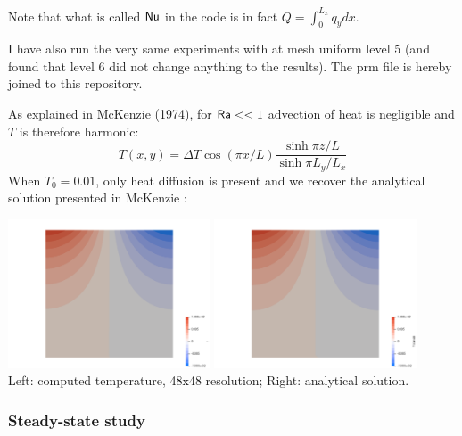 Note that what is called ${\mathsf{Nu}}$ in the code is in fact $Q=\int_0^{L_x} q_y dx$.

I have also run the very same experiments with \aspect{} at mesh uniform level 5 (and found that 
level 6 did not change anything to the results). The prm file is hereby joined to this repository.

As explained in McKenzie \etal (1974), for ${\mathsf{Ra}} <<1$ advection of heat is negligible and $T$ is 
therefore harmonic:
\[
T(x,y) = \Delta T \cos (\pi x/L) \frac{\sinh \pi z/L}{\sinh \pi L_y/L_x}
\]
When $T_0=0.01$, only heat diffusion is present and we recover the analytical solution presented 
in McKenzie \etal:

\begin{center}
\includegraphics[width=6cm]{python_codes/fieldstone_38/results/T0_0p001_32x32/T}
\includegraphics[width=6cm]{python_codes/fieldstone_38/results/T0_0p001_32x32/T_anal}\\
{\captionfont Left: computed temperature, 48x48 resolution; Right: analytical solution.}
\end{center}

\newpage
\subsubsection*{Steady-state study}

